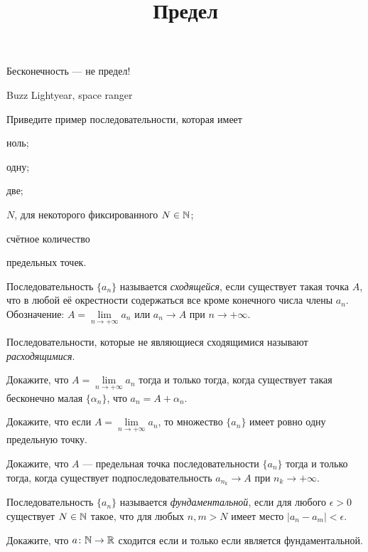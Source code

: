 \documentclass[a4paper, 12pt, num=30]{listok}
\begin{document}
\title{Предел}
\maketitle{}

\epigraph{%
    Бесконечность --- не предел!
}{%
    Buzz Lightyear, space ranger
}
\begin{problem}
    Приведите пример последовательности, которая имеет
    \begin{probparts}
        \item ноль;
        \item одну;
        \item две;
        \item $N$, для некоторого фиксированного $N \in \mathbb{N}$;
        \item счётное количество
    \end{probparts}
    предельных точек.
\end{problem}
\begin{definition}
    Последовательность $\{a_n\}$ называется \textit{сходящейся}, если существует такая точка $A$, что в любой её окрестности содержаться все кроме конечного числа члены $a_n$.
    Обозначение: $A = \lim\limits_{n \to +\infty} a_n$ или $a_n \to A$ при $n \to +\infty$.

    Последовательности, которые не являющиеся сходящимися называют \textit{расходящимися}.
\end{definition}
\begin{problem}
    Докажите, что $A = \lim\limits_{n \to +\infty} a_n$ тогда и только тогда, когда существует такая бесконечно малая $\{\alpha_n\}$, что $a_n = A + \alpha_n$.
\end{problem}
\begin{problem}
    Докажите, что если $A = \lim\limits_{n \to +\infty} a_n$, то множество $\{a_n\}$ имеет ровно одну предельную точку.
\end{problem}
\begin{problem}
    Докажите, что $A$ --- предельная точка последовательности $\{a_n\}$ тогда и только тогда, когда существует подпоследовательность $a_{n_k} \to A$ при $n_k \to +\infty$.
\end{problem}
\begin{definition}
    Последовательность $\{a_n\}$ называется \textit{фундаментальной}, если для любого $\epsilon > 0$ существует $N \in \mathbb{N}$ такое,
    что для любых $n, m > N$ имеет место  $|a_n - a_m| < \epsilon$.
\end{definition}
\begin{problem}
    Докажите, что $a \colon \mathbb{N} \to \mathbb{R}$ сходится если и только если является фундаментальной.
\end{problem}
\end{document}
